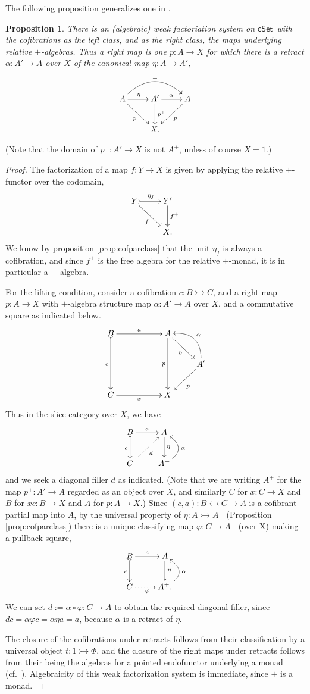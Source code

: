\documentclass[11pt]{amsart}
\newcommand{\cSet}{\ensuremath{\mathsf{cSet}}}
\newcommand{\mono}{\ensuremath{\rightarrowtail}}
\newcommand{\ra}{\ensuremath{\rightarrow}}
\newcommand{\cof}{\ensuremath{\rightarrowtail}}
\renewcommand{\to}{\ensuremath{\rightarrow}}
\newtheorem{proposition}[theorem]{Proposition}
\theoremstyle{remark}
\theoremstyle{definition}
\begin{document}
The following proposition generalizes one in \cite{BurkeGarner}.
\begin{proposition}
There is an (algebraic) weak factoriation system on \cSet\ with the cofibrations as the left class, and as the right class, the maps underlying relative $+$-algebras.  Thus a right map is one $p : A\ra X$ for which there is a retract $\alpha : A'\ra A$ over $X$ of the canonical map $\eta : A\ra A'$,
\[
\xymatrix{
A\ar[rd]_{p} \ar[r]^{\eta} \ar@/^5ex/ [rr]^= & A' \ar[r]^{\alpha} \ar[d]^-{p^+} & \ar[ld]^{p} A \\
& X. &
}
\]
\end{proposition}
%
(Note that the domain of $p^+ : A' \to X$ is not $A^+$, unless of course $X = 1$.)
\begin{proof}
The factorization of a map $f : Y\ra X$ is given by applying the relative $+$-functor over the codomain,
\[
\xymatrix{
Y\ar[rd]_{f} \ar@{>->}[r]^{\eta_f} & Y' \ar[d]^-{f^{+}} \\
& X. 
}
\]
We know by proposition \ref{prop:cofparclass} that the unit $\eta_f$ is always a cofibration, and since $f^{+}$ is the free algebra for the relative $+$-monad, it is in particular a $+$-algebra.

For the lifting condition, consider a cofibration $c : B\mono C$, and a right map $p:A\ra X$ with $+$-algebra structure map $\alpha: A' \ra A$ over $X$, and a commutative square as indicated below.
\[
\xymatrix{
B \ar@{>->}[dd]_{c} \ar[rr]^{a}  && A \ar[dd]_p \ar[rd]_{\eta} & \\
 &&& A' \ar@/_4ex/ [lu]_\alpha  \ar[ld]^{p^+} \\
C \ar[rr]_{x} && X &
}
\]
Thus in the slice category over $X$, we have
\[
\xymatrix{
B\ar@{>->}[d]_{c} \ar[r]^{a} & A \ar[d]^-{\eta} \\
C \ar@{.>}[ru]_{d} & A^+ \ar@/_4ex/ [u]_\alpha
}
\]
and we seek a diagonal filler $d$ as indicated.  (Note that we are writing $A^+$ for the map $p^+ : A'\to A$ regarded as an object over $X$, and similarly $C$ for $x : C\to X$ and $B$ for $xc : B\to X$ and $A$ for $p:A\to X$.)
Since $(c,a) : B \leftarrowtail C \ra A$ is a cofibrant partial map into $A$, by the universal property of $\eta : A \cof A^+$ (Proposition \ref{prop:cofparclass}) there is a unique classifying map $\varphi : C \ra A^+$ (over X) making a pullback square,
\[
\xymatrix{
B\ar@{>->}[d]_{c} \ar[r]^{a} & A \ar[d]^-{\eta} \\
C \ar@{.>}[r]_{\varphi} & A^+. \ar@/_4ex/ [u]_\alpha
}
\]
We can set $d := \alpha\circ \varphi : C \ra A$ to obtain the required diagonal filler, since $dc = \alpha\varphi{c} = \alpha\eta{a} = a$, because $\alpha$ is a retract of $\eta$.

The closure of the cofibrations under retracts follows from their classification by a universal object $t : 1 \cof \Phi$, and the closure of the right maps under retracts follows from their being the algebras for a pointed endofunctor underlying a monad (cf.~\cite{RV}).  Algebraicity of this weak factorization system is immediate, since $+$ is a monad.
\end{proof}
\end{document}
